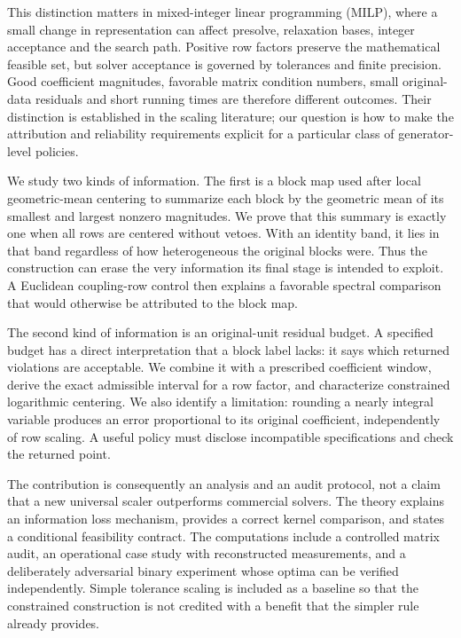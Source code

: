 \documentclass[11pt]{article}
\theoremstyle{definition}
\theoremstyle{remark}
\begin{document}
This distinction matters in mixed-integer linear programming (MILP), where a small change
in representation can affect presolve, relaxation bases, integer acceptance and the search
path. Positive row factors preserve the mathematical feasible set, but solver acceptance
is governed by tolerances and finite precision. Good coefficient magnitudes, favorable
matrix condition numbers, small original-data residuals and short running times are
therefore different outcomes. Their distinction is established in the scaling literature;
our question is how to make the attribution and reliability requirements explicit for a
particular class of generator-level policies.

We study two kinds of information. The first is a block map used after local
geometric-mean centering to summarize each block by the geometric mean of its smallest
and largest nonzero magnitudes. We prove that this summary is exactly one when all rows
are centered without vetoes. With an identity band, it lies in that band regardless of
how heterogeneous the original blocks were. Thus the construction can erase the very
information its final stage is intended to exploit. A Euclidean coupling-row control
then explains a favorable spectral comparison that would otherwise be attributed to the
block map.

The second kind of information is an original-unit residual budget. A specified budget
has a direct interpretation that a block label lacks: it says which returned violations
are acceptable. We combine it with a prescribed coefficient window, derive the exact
admissible interval for a row factor, and characterize constrained logarithmic centering.
We also identify a limitation: rounding a nearly integral variable produces an error
proportional to its original coefficient, independently of row scaling. A useful policy
must disclose incompatible specifications and check the returned point.

The contribution is consequently an analysis and an audit protocol, not a claim that a
new universal scaler outperforms commercial solvers. The theory explains an information
loss mechanism, provides a correct kernel comparison, and states a conditional
feasibility contract. The computations include a controlled matrix audit, an operational
case study with reconstructed measurements, and a deliberately adversarial binary
experiment whose optima can be verified independently. Simple tolerance scaling is
included as a baseline so that the constrained construction is not credited with a
benefit that the simpler rule already provides.
\end{document}
